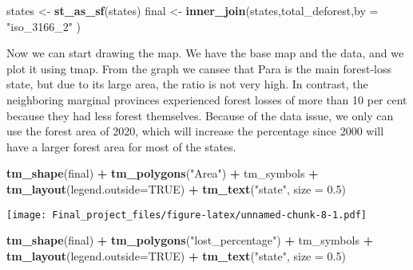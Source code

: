 \documentclass[
]{article}
\newenvironment{Shaded}{\begin{snugshade}}{\end{snugshade}}
\newcommand{\AttributeTok}[1]{\textcolor[rgb]{0.13,0.29,0.53}{#1}}
\newcommand{\ConstantTok}[1]{\textcolor[rgb]{0.56,0.35,0.01}{#1}}
\newcommand{\FloatTok}[1]{\textcolor[rgb]{0.00,0.00,0.81}{#1}}
\newcommand{\FunctionTok}[1]{\textcolor[rgb]{0.13,0.29,0.53}{\textbf{#1}}}
\newcommand{\NormalTok}[1]{#1}
\newcommand{\OtherTok}[1]{\textcolor[rgb]{0.56,0.35,0.01}{#1}}
\newcommand{\SpecialCharTok}[1]{\textcolor[rgb]{0.81,0.36,0.00}{\textbf{#1}}}
\newcommand{\StringTok}[1]{\textcolor[rgb]{0.31,0.60,0.02}{#1}}
\begin{document}
\begin{Shaded}
\begin{Highlighting}[]
\NormalTok{states }\OtherTok{\textless{}{-}} \FunctionTok{st\_as\_sf}\NormalTok{(states)}
\NormalTok{final }\OtherTok{\textless{}{-}} \FunctionTok{inner\_join}\NormalTok{(states,total\_deforest,}\AttributeTok{by =} \StringTok{"iso\_3166\_2"}\NormalTok{ )}
\end{Highlighting}
\end{Shaded}

Now we can start drawing the map. We have the base map and the data, and
we plot it using tmap. From the graph we cansee that Para is the main
forest-loss state, but due to its large area, the ratio is not very
high. In contrast, the neighboring marginal provinces experienced forest
losses of more than 10 per cent because they had less forest themselves.
Because of the data issue, we only can use the forest area of 2020,
which will increase the percentage since 2000 will have a larger forest
area for most of the states.

\begin{Shaded}
\begin{Highlighting}[]
\FunctionTok{tm\_shape}\NormalTok{(final) }\SpecialCharTok{+} \FunctionTok{tm\_polygons}\NormalTok{(}\StringTok{"Area"}\NormalTok{) }\SpecialCharTok{+}\NormalTok{ tm\_symbols }\SpecialCharTok{+} \FunctionTok{tm\_layout}\NormalTok{(}\AttributeTok{legend.outside=}\ConstantTok{TRUE}\NormalTok{) }\SpecialCharTok{+} \FunctionTok{tm\_text}\NormalTok{(}\StringTok{"state"}\NormalTok{, }\AttributeTok{size =} \FloatTok{0.5}\NormalTok{) }
\end{Highlighting}
\end{Shaded}

\texttt{[image: Final\_project\_files/figure-latex/unnamed-chunk-8-1.pdf]}

\begin{Shaded}
\begin{Highlighting}[]
\FunctionTok{tm\_shape}\NormalTok{(final) }\SpecialCharTok{+} \FunctionTok{tm\_polygons}\NormalTok{(}\StringTok{"lost\_percentage"}\NormalTok{) }\SpecialCharTok{+}\NormalTok{ tm\_symbols }\SpecialCharTok{+} \FunctionTok{tm\_layout}\NormalTok{(}\AttributeTok{legend.outside=}\ConstantTok{TRUE}\NormalTok{) }\SpecialCharTok{+} \FunctionTok{tm\_text}\NormalTok{(}\StringTok{"state"}\NormalTok{, }\AttributeTok{size =} \FloatTok{0.5}\NormalTok{)}
\end{Highlighting}
\end{Shaded}
\end{document}
